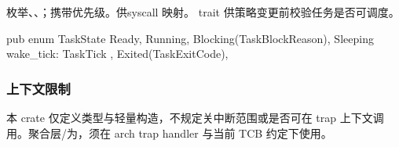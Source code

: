 枚举、、；携带优先级。供syscall 映射。 trait 供策略变更前校验任务是否可调度。

\begin{rustcode}
pub enum TaskState {
    Ready,
    Running,
    Blocking(TaskBlockReason),
    Sleeping { wake_tick: TaskTick },
    Exited(TaskExitCode),
}
\end{rustcode}

\subsubsection{上下文限制}

本 crate 仅定义类型与轻量构造，不规定关中断范围或是否可在 trap 上下文调用。聚合层/为，须在 arch trap handler 与当前 TCB 约定下使用。
